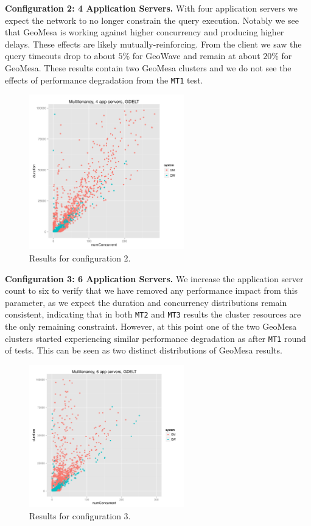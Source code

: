{\bf Configuration 2: 4 Application Servers.}
With four application servers we expect the network to no longer constrain the query execution. Notably we see that GeoMesa is working against higher concurrency and producing higher delays.
These effects are likely mutually-reinforcing.
From the client we saw the query timeouts drop to about $5$\% for GeoWave and remain at about $20$\% for GeoMesa.
These results contain two GeoMesa clusters and we do not see the effects of performance degradation from the \texttt{MT1} test.
\begin{figure}[h!tb]
  \centering
  \includegraphics[width=0.60\textwidth]{../docs/img/multitenancy/graph_100k_mt2.png}
  \caption{Results for configuration 2.}
  \label{config2}
\end{figure}

{\bf Configuration 3: 6 Application Servers.}
We increase the application server count to six to verify that we have removed any performance impact from this parameter, as we expect the duration and concurrency distributions remain consistent, indicating that in both \texttt{MT2} and \texttt{MT3} results the cluster resources are the only remaining constraint.
However, at this point one of the two GeoMesa clusters started experiencing similar performance degradation as after \texttt{MT1} round of tests.
This can be seen as two distinct distributions of GeoMesa results.
\begin{figure}[h!tb]
  \centering
  \includegraphics[width=0.60\textwidth]{../docs/img/multitenancy/graph_100k_mt3.png}
  \caption{Results for configuration 3.}
  \label{config3}
\end{figure}


